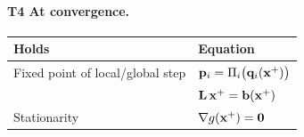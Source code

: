\paragraph{T4 At convergence.}\mbox{}
\begin{center}
\renewcommand{\arraystretch}{1.6}
\begin{tabular}{ll}
\textbf{Holds} & \textbf{Equation} \\ \hline
Fixed point of local/global step & $\mathbf{p}_i = \Pi_i\big(\mathbf{q}_i(\mathbf{x}^+)\big)$ \\
& $\mathbf{L}\,\mathbf{x}^+ = \mathbf{b}(\mathbf{x}^+)$ \\
Stationarity & $\nabla g(\mathbf{x}^+) = \mathbf{0}$ \\
\end{tabular}
\end{center}

